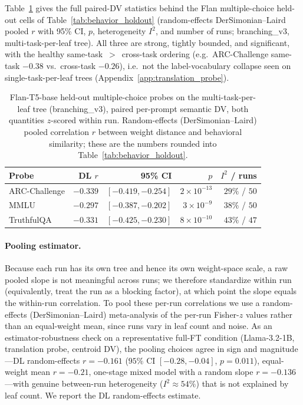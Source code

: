 \documentclass{article}
\theoremstyle{definition}
\theoremstyle{plain}
\begin{document}
Table~\ref{tab:flan_holdout_ci} gives the full paired-DV statistics behind the Flan multiple-choice
held-out cells of Table~\ref{tab:behavior_holdout} (random-effects DerSimonian--Laird pooled $r$ with
95\% CI, $p$, heterogeneity $I^2$, and number of runs; branching\_v3, multi-task-per-leaf tree). All
three are strong, tightly bounded, and significant, with the healthy same-task~$>$~cross-task ordering
(e.g.\ ARC-Challenge same-task $-0.38$ vs.\ cross-task $-0.26$), i.e.\ not the label-vocabulary collapse
seen on single-task-per-leaf trees (Appendix~\ref{app:translation_probe}).

\begin{table}[h]
\caption{Flan-T5-base held-out multiple-choice probes on the multi-task-per-leaf tree (branching\_v3),
  paired per-prompt semantic DV, both quantities $z$-scored within run. Random-effects
  (DerSimonian--Laird) pooled correlation $r$ between weight distance and behavioral similarity; these
  are the numbers rounded into Table~\ref{tab:behavior_holdout}.}
\label{tab:flan_holdout_ci}
\begin{center}
\begin{tabular}{lrrrr}
\toprule
Probe & DL $r$ & 95\% CI & $p$ & $I^2$ / runs \\
\midrule
ARC-Challenge & $-0.339$ & $[-0.419, -0.254]$ & $2\!\times\!10^{-13}$ & $29\%$ / $50$ \\
MMLU          & $-0.297$ & $[-0.387, -0.202]$ & $3\!\times\!10^{-9}$  & $38\%$ / $50$ \\
TruthfulQA    & $-0.331$ & $[-0.425, -0.230]$ & $8\!\times\!10^{-10}$ & $43\%$ / $47$ \\
\bottomrule
\end{tabular}
\end{center}
\end{table}

\paragraph{Pooling estimator.} Because each run has its own tree and hence its own weight-space scale, a
raw pooled slope is not meaningful across runs; we therefore standardize within run (equivalently, treat
the run as a blocking factor), at which point the slope equals the within-run correlation. To pool these
per-run correlations we use a random-effects (DerSimonian--Laird) meta-analysis of the per-run Fisher-$z$
values rather than an equal-weight mean, since runs vary in leaf count and noise. As an estimator-robustness check on a representative full-FT
condition (Llama-3.2-1B, translation probe, centroid DV), the pooling choices agree in sign and
magnitude---DL random-effects $r=-0.161$ ($95\%$ CI $[-0.28,-0.04]$, $p=0.011$), equal-weight mean
$r=-0.21$, one-stage mixed model with a random slope $r=-0.136$---with genuine between-run heterogeneity
($I^2\approx54\%$) that is not explained by leaf count. We report the DL random-effects estimate.
\end{document}
